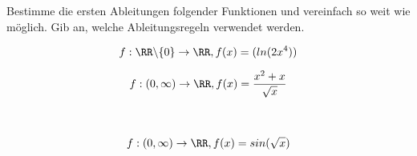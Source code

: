 Bestimme die ersten Ableitungen folgender Funktionen und vereinfach so weit wie möglich. Gib an, welche Ableitungsregeln verwendet werden.\\
\begin{minipage}[t]{0.49\textwidth}
    \begin{subtask}
        \[f:\RR\backslash \{0\} \to \RR, f(x)=(ln(2x^4))\]
    \end{subtask}
    \begin{solution}
        
    \end{solution}
\end{minipage} %
\begin{minipage}[t]{0.49\textwidth}
    \begin{subtask}
        \[f:(0,\infty)\to\RR, f(x)=\frac{x^2+x}{\sqrt{x}}\]
    \end{subtask}
    \begin{solution}
        
    \end{solution}
\end{minipage}\\
\begin{subtask}
    \[f:(0,\infty)\to\RR, f(x)=sin(\sqrt{x})\]
\end{subtask}
\begin{solution}
    
\end{solution}